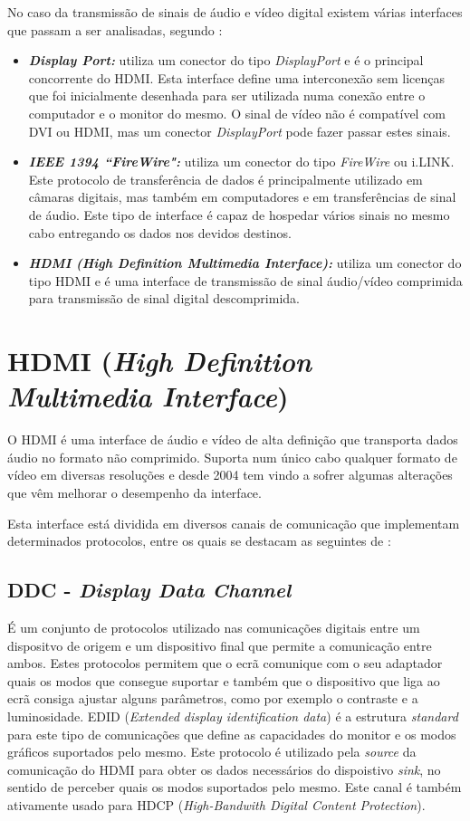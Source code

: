 No caso da transmissão de sinais de áudio e vídeo digital existem várias interfaces que passam a ser analisadas, segundo \cite{R004}:
\begin{itemize}
	\item \textbf{\textit{Display Port:}} utiliza um conector do tipo \textit{DisplayPort} e é o principal concorrente do HDMI. Esta interface define uma interconexão sem licenças que foi inicialmente desenhada para ser utilizada numa conexão entre o computador e o monitor do mesmo. O sinal de vídeo não é compatível com DVI ou HDMI, mas um conector \textit{DisplayPort} pode fazer passar estes sinais.
	\item \textbf{\textit{ IEEE 1394 “FireWire":}} utiliza um conector do tipo \textit{FireWire} ou i.LINK. Este protocolo de transferência de dados é principalmente utilizado em câmaras digitais, mas também em computadores e em transferências de sinal de áudio. Este tipo de interface é capaz de hospedar vários sinais no mesmo cabo entregando os dados nos devidos destinos.
	\item \textbf{\textit{HDMI (High Definition Multimedia Interface):}} utiliza um conector do tipo HDMI e é uma interface de transmissão de sinal áudio/vídeo comprimida para transmissão de sinal digital descomprimida. 
\end{itemize}

\section{HDMI (\textit{High Definition Multimedia Interface})}\label{sec:dialecto}
O HDMI é uma interface de áudio e vídeo de alta definição que transporta dados áudio no formato não comprimido. Suporta num único cabo qualquer formato de vídeo em diversas resoluções e desde 2004 tem vindo a sofrer algumas alterações que vêm melhorar o desempenho da interface. 

Esta interface está dividida em diversos canais de comunicação que implementam determinados protocolos, entre os quais se destacam as seguintes de \cite{R002}:
\subsection{DDC - \textit{Display Data Channel} } \label{batik} 
É um conjunto de protocolos utilizado nas comunicações digitais entre um dispositvo de origem e um dispositivo final que permite a comunicação entre ambos. Estes protocolos permitem que o ecrã comunique com o seu adaptador quais os modos que consegue suportar e também que o dispositivo que liga ao ecrã consiga ajustar alguns parâmetros, como por exemplo o contraste e a luminosidade. EDID (\textit{Extended display identification data}) é a estrutura \textit{standard} para este tipo de comunicações que define as capacidades do monitor e os modos gráficos suportados pelo mesmo.  Este protocolo é utilizado pela \textit{source} da comunicação do HDMI para obter os dados necessários do dispoistivo \textit{sink}, no sentido de perceber quais os modos suportados pelo mesmo. Este canal é também ativamente usado para HDCP (\textit{High-Bandwith Digital Content Protection}).

